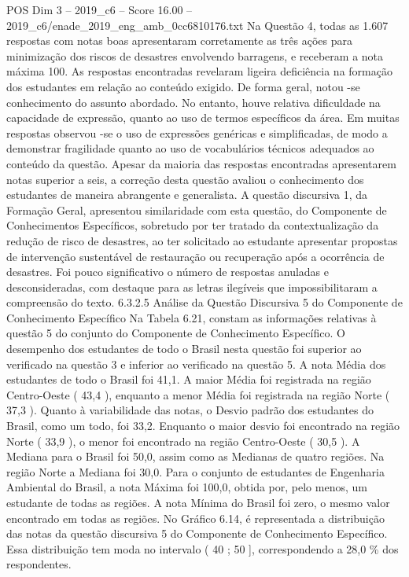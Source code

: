 \begin{textsample}{POS Dim 3 – 2019\_c6 – Score 16.00 – 2019\_c6/enade\_2019\_eng\_amb\_0cc6810176.txt}
Na Questão 4, todas as 1.607 respostas com notas boas apresentaram corretamente as três ações para minimização dos riscos de desastres envolvendo barragens, e receberam a nota máxima 100.
As respostas encontradas revelaram ligeira deficiência na formação dos estudantes em relação ao conteúdo exigido.
De forma geral, notou -se conhecimento do assunto abordado.
No entanto, houve relativa dificuldade na capacidade de expressão, quanto ao uso de termos específicos da área.
Em muitas respostas observou -se o uso de expressões genéricas e simplificadas, de modo a demonstrar fragilidade quanto ao uso de vocabulários técnicos adequados ao conteúdo da questão.
Apesar da maioria das respostas encontradas apresentarem notas superior a seis, a correção desta questão avaliou o conhecimento dos estudantes de maneira abrangente e generalista.
A questão discursiva 1, da Formação Geral, apresentou similaridade com esta questão, do Componente de Conhecimentos Específicos, sobretudo por ter tratado da contextualização da redução de risco de desastres, ao ter solicitado ao estudante apresentar propostas de intervenção sustentável de restauração ou recuperação após a ocorrência de desastres.
Foi pouco significativo o número de respostas anuladas e desconsideradas, com destaque para as letras ilegíveis que impossibilitaram a compreensão do texto. 6.3.2.5 Análise da Questão Discursiva 5 do Componente de Conhecimento Específico Na Tabela 6.21, constam as informações relativas à questão 5 do conjunto do Componente de Conhecimento Específico.
O desempenho dos estudantes de todo o Brasil nesta questão foi superior ao verificado na questão 3 e inferior ao verificado na questão 5.
A nota Média dos estudantes de todo o Brasil foi 41,1.
A maior Média foi registrada na região Centro-Oeste ( 43,4 ), enquanto a menor Média foi registrada na região Norte ( 37,3 ).
Quanto à variabilidade das notas, o Desvio padrão dos estudantes do Brasil, como um todo, foi 33,2.
Enquanto o maior desvio foi encontrado na região Norte ( 33,9 ), o menor foi encontrado na região Centro-Oeste ( 30,5 ).
A Mediana para o Brasil foi 50,0, assim como as Medianas de quatro regiões.
Na região Norte a Mediana foi 30,0.
Para o conjunto de estudantes de Engenharia Ambiental do Brasil, a nota Máxima foi 100,0, obtida por, pelo menos, um estudante de todas as regiões.
A nota Mínima do Brasil foi zero, o mesmo valor encontrado em todas as regiões.
No Gráfico 6.14, é representada a distribuição das notas da questão discursiva 5 do Componente de Conhecimento Específico.
Essa distribuição tem moda no intervalo ( 40 ; 50 ], correspondendo a 28,0 \% dos respondentes.

\end{textsample}
